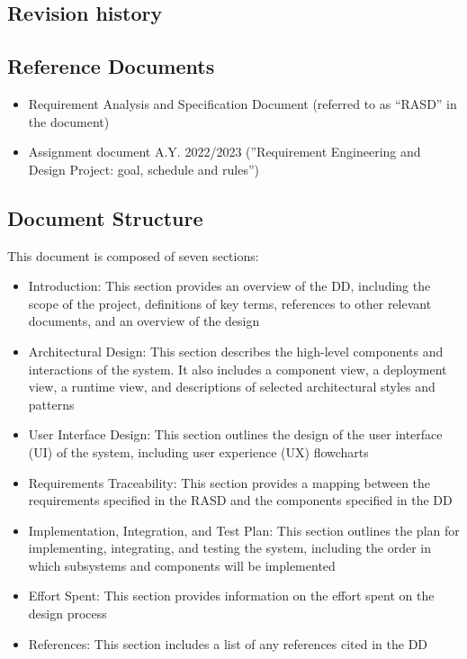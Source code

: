 \subsection{Revision history}
\subsection{Reference Documents}
\begin{itemize}
    \item Requirement Analysis and Specification Document (referred to as “RASD” in the document)
    \item Assignment document A.Y. 2022/2023 (”Requirement Engineering and Design Project: goal, schedule
          and rules”)
\end{itemize}
\subsection{Document Structure}

This document is composed of seven sections:
\begin{itemize}
    \item Introduction: This section provides an overview of the DD, including the scope of the project, definitions of key terms, references to other relevant documents, and an overview of the design
    \item Architectural Design: This section describes the high-level components and interactions of the system. It also includes a component view, a deployment view, a runtime view, and descriptions of selected architectural styles and patterns
    \item User Interface Design: This section outlines the design of the user interface (UI) of the system, including user experience (UX) flowcharts
    \item Requirements Traceability: This section provides a mapping between the requirements specified in the RASD and the components specified in the DD
    \item Implementation, Integration, and Test Plan: This section outlines the plan for implementing, integrating, and testing the system, including the order in which subsystems and components will be implemented
    \item Effort Spent: This section provides information on the effort spent on the design process
    \item References: This section includes a list of any references cited in the DD
\end{itemize}
